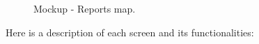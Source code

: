 {\begin{figure}[H]
\centering
\begin{minipage}{.4\textwidth}
    \centering
    \caption{\label{fig:mockup-reports-map}Mockup - Reports map.}
\end{minipage}
\end{figure}
}

Here is a description of each screen and its functionalities:\\

